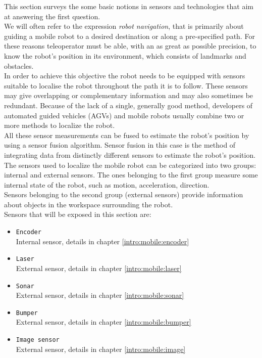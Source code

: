 This section surveys the some basic notions in sensors 
and technologies that aim at answering the
first question.
\\
We will often refer to the expression \textit{robot navigation},
that is primarily about guiding a mobile robot to a desired destination
or along a pre-specified path. For these reasons teleoperator must
be able, with an as great as possible precision, to know the robot's
position in its environment, which consists of landmarks and obstacles.
\\
In order to achieve this objective the robot needs to be equipped with
sensors suitable to localise the robot throughout the path it is to follow.
These sensors may give overlapping or complementary information and may
also sometimes be redundant. Because of the lack of a single, generally
good method, developers of  automated guided vehicles (AGVs) and mobile
robots usually combine two or more methods to localize the robot.
\\
All these sensor measurements can be fused to estimate the robot's
position by using a sensor fusion algorithm. Sensor fusion
in this case is the method of integrating data from distinctly
different sensors to estimate the robot's position.
\\
The sensors used to localize the mobile robot can be categorized into
two groups: internal and external sensors. The ones belonging to the first
group measure some internal state of the robot, such as motion, acceleration,
direction.
\\
Sensors belonging to the second group (external sensors) provide information
about objects in the workspace surrounding the robot.
\\
Sensors that will be exposed in this section are:
\begin{itemize}
\item \texttt{Encoder} \\
  Internal sensor, details in chapter \ref{intro:mobile:encoder}
\item \texttt{Laser} \\
  External sensor, details in chapter \ref{intro:mobile:laser}
\item \texttt{Sonar} \\
  External sensor, details in chapter \ref{intro:mobile:sonar}
\item \texttt{Bumper} \\
  External sensor, details in chapter \ref{intro:mobile:bumper}
\item \texttt{Image sensor} \\
  External sensor, details in chapter \ref{intro:mobile:image}
\end{itemize}

